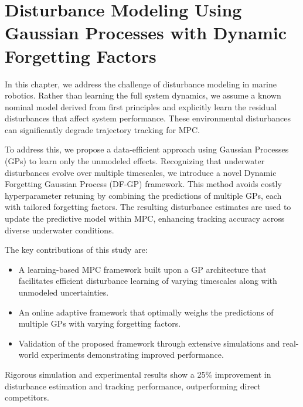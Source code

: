 \chapter{Disturbance Modeling Using Gaussian Processes with Dynamic Forgetting Factors}
\label{ch:dfgp}

In this chapter, we address the challenge of disturbance modeling in marine robotics. Rather than learning the full system dynamics, we assume a known nominal model derived from first principles and explicitly learn the residual disturbances that affect system performance. These environmental disturbances can significantly degrade trajectory tracking for MPC. 

To address this, we propose a data-efficient approach using Gaussian Processes (GPs) to learn only the unmodeled effects. Recognizing that underwater disturbances evolve over multiple timescales, we introduce a novel Dynamic Forgetting Gaussian Process (DF-GP) framework. This method avoids costly hyperparameter retuning by combining the predictions of multiple GPs, each with tailored forgetting factors. The resulting disturbance estimates are used to update the predictive model within MPC, enhancing tracking accuracy across diverse underwater conditions.




The key contributions of this study are:

\begin{itemize}
\item A learning-based MPC framework built upon a GP architecture that facilitates efficient disturbance learning of varying timescales along with unmodeled uncertainties.
\item An online adaptive framework that optimally weighs the predictions of multiple GPs with varying forgetting factors.
\item Validation of the proposed framework through extensive simulations and real-world experiments demonstrating improved performance.
\end{itemize}

Rigorous simulation and experimental results show a 25\% improvement in disturbance estimation and tracking performance, outperforming direct competitors.
